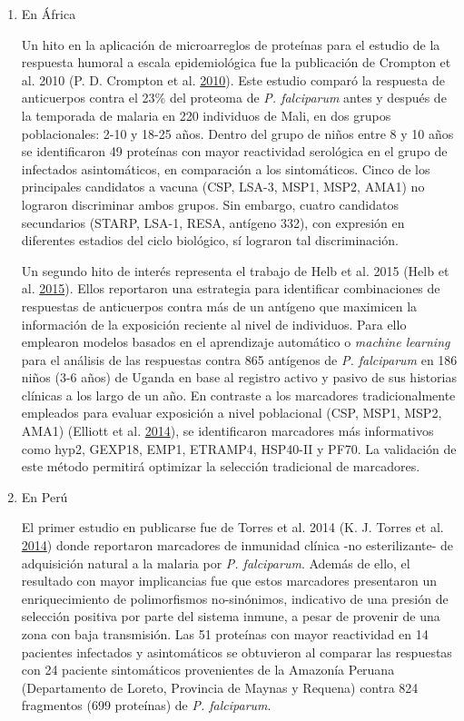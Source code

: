 \documentclass[a4paper]{article}
\begin{document}
\begin{enumerate}
\def\labelenumi{\alph{enumi}.}
\item
  En África

  Un hito en la aplicación de microarreglos de proteínas para el estudio
  de la respuesta humoral a escala epidemiológica fue la publicación de
  Crompton et al. 2010 (P. D. Crompton et al.
  \protect\hyperlink{ref-crompton2010}{2010}). Este estudio comparó la
  respuesta de anticuerpos contra el 23\% del proteoma de \emph{P.
  falciparum} antes y después de la temporada de malaria en 220
  individuos de Mali, en dos grupos poblacionales: 2-10 y 18-25 años.
  Dentro del grupo de niños entre 8 y 10 años se identificaron 49
  proteínas con mayor reactividad serológica en el grupo de infectados
  asintomáticos, en comparación a los sintomáticos. Cinco de los
  principales candidatos a vacuna (CSP, LSA-3, MSP1, MSP2, AMA1) no
  lograron discriminar ambos grupos. Sin embargo, cuatro candidatos
  secundarios (STARP, LSA-1, RESA, antígeno 332), con expresión en
  diferentes estadios del ciclo biológico, sí lograron tal
  discriminación.

  Un segundo hito de interés representa el trabajo de Helb et al. 2015
  (Helb et al. \protect\hyperlink{ref-Helb2015exposure}{2015}). Ellos
  reportaron una estrategia para identificar combinaciones de respuestas
  de anticuerpos contra más de un antígeno que maximicen la información
  de la exposición reciente al nivel de individuos. Para ello emplearon
  modelos basados en el aprendizaje automático o \emph{machine learning}
  para el análisis de las respuestas contra 865 antígenos de \emph{P.
  falciparum} en 186 niños (3-6 años) de Uganda en base al registro
  activo y pasivo de sus historias clínicas a los largo de un año. En
  contraste a los marcadores tradicionalmente empleados para evaluar
  exposición a nivel poblacional (CSP, MSP1, MSP2, AMA1) (Elliott et al.
  \protect\hyperlink{ref-elliott2014}{2014}), se identificaron
  marcadores más informativos como hyp2, GEXP18, EMP1, ETRAMP4, HSP40-II
  y PF70. La validación de este método permitirá optimizar la selección
  tradicional de marcadores. 
\item
  En Perú

  El primer estudio en publicarse fue de Torres et al. 2014 (K. J.
  Torres et al. \protect\hyperlink{ref-Torres2014asymptomatic}{2014})
  donde reportaron marcadores de inmunidad clínica -no esterilizante- de
  adquisición natural a la malaria por \emph{P. falciparum}. Además de
  ello, el resultado con mayor implicancias fue que estos marcadores
  presentaron un enriquecimiento de polimorfismos no-sinónimos,
  indicativo de una presión de selección positiva por parte del sistema
  inmune, a pesar de provenir de una zona con baja transmisión. Las 51
  proteínas con mayor reactividad en 14 pacientes infectados y
  asintomáticos se obtuvieron al comparar las respuestas con 24 paciente
  sintomáticos provenientes de la Amazonía Peruana (Departamento de
  Loreto, Provincia de Maynas y Requena) contra 824 fragmentos (699
  proteínas) de \emph{P. falciparum}.


\end{enumerate}
\end{document}
